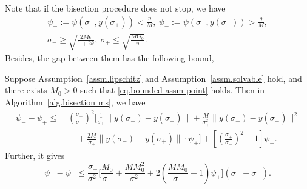 \documentclass{mcom-l}
\numberwithin{equation}{section}
\begin{document}
Note that if the bisection procedure does not stop, we have
\begin{gather}
    \label{eq.bisection condition}
    \psi_+:=\psi(\sigma_+,y(\sigma_+))<\frac{\eta}{M}, \ \psi_-:=\psi(\sigma_-,y(\sigma_-))>\frac{\theta}{M},\\
    \label{eq.bracket points condition}
    \sigma_- \geq \sqrt{\frac{2M\epsilon}{1+2\theta}}, \ \sigma_+ \leq \sqrt{\frac{MG_0}{\eta}}.
\end{gather}
Besides, the gap between them has the following bound,
\begin{lemma}
    \label{lem.bound gap bisection}
    Suppose Assumption~\ref{assm.lipschitz} and Assumption~\ref{assm.solvable} hold, and there exists $M_0>0$ such that \eqref{eq.bounded assm point} holds. Then in Algorithm~\ref{alg.bisection ms}, we have
    \begin{equation}\label{eq.bound gap bisection}
        \begin{aligned}
            \psi_- - \psi_+
            \leq\; & \left( \frac{\sigma_+}{\sigma_-} \right)^2 \Bigg[
                \frac{1}{\sigma_+} \|y(\sigma_-)-y(\sigma_+)\|
            + \frac{M}{\sigma_+^2} \|y(\sigma_-)-y(\sigma_+)\|^2                          \\
                   & \quad + \frac{2M}{\sigma_+} \|y(\sigma_-)-y(\sigma_+)\| \cdot \psi_+
                \Bigg]
            + \left[ \left( \frac{\sigma_+}{\sigma_-} \right)^2 - 1 \right] \psi_+.
        \end{aligned}
    \end{equation}
    Further, it gives
    \begin{equation}
        \label{eq.bounded gap bisection sigma}
        \psi_- - \psi_+
        \leq \frac{\sigma_+}{\sigma_-^2} \Bigg[
            \frac{M_0}{\sigma_-}
            + \frac{M M_0^2}{\sigma_-^2}+ 2\left( \frac{M M_0}{\sigma_-} + 1 \right)\psi_+
            \Bigg](\sigma_+ - \sigma_-).
    \end{equation}
\end{lemma}
\end{document}
